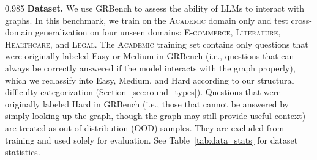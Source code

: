 \documentclass[11pt]{article}
\begin{document}
\begin{spacing}{0.985}
\noindent \textbf{Dataset.}
We use GRBench \cite{jin2024graph} to assess the ability of LLMs to interact with graphs.
In this benchmark, we train on the \textsc{Academic} domain only and test cross-domain generalization on four unseen domains: \textsc{E-commerce}, \textsc{Literature}, \textsc{Healthcare}, and \textsc{Legal}.
The \textsc{Academic} training set contains only questions that were originally labeled Easy or Medium in GRBench (i.e., questions that can always be correctly answered if the model interacts with the graph properly), which we reclassify into Easy, Medium, and Hard according to our structural difficulty categorization (Section~\ref{sec:round_types}).
Questions that were originally labeled Hard in GRBench (i.e., those that cannot be answered by simply looking up the graph, though the graph may still provide useful context) are treated as out-of-distribution (OOD) samples. They are excluded from training and used solely for evaluation. See Table~\ref{tab:data_stats} for dataset statistics.

\begin{table}[h]
\centering
\small
\setlength{\tabcolsep}{5pt}
\vspace{-0.5em}
\caption{Dataset statistics. \colorbox{red!15}{Red}: training data. \colorbox{blue!15}{Blue}: testing data. Difficulty levels are defined in Section~\ref{sec:round_types}.}
\label{tab:data_stats}
\vspace{-1em}
\end{table}


\end{spacing}
\end{document}
